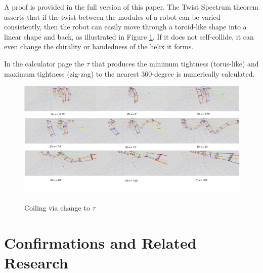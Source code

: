 \documentclass{svproc}
\begin{document}
A proof is provided in the full version of this paper\cite{readfullsegmentedhelix}.
The Twist Spectrum theorem asserts that if the twist between the modules of a robot
can be varied consistently, then the robot can easily move through a toroid-like shape
into a linear shape and back, as illustrated in Figure \ref{fig:coiling}. If it does not self-collide, it can even change the chirality
or handedness of the helix it forms.

In the calculator page
the $\tau$ that produces the minimum tightness (torus-like) and maximum tightness (zig-zag) to the
nearest 360-degree is numerically calculated.

\begin{figure}
  \centering


{\includegraphics[width=1.0\textwidth]{figures/CoilingFigure.png}}
\caption{Coiling via change to $\tau$}\label{fig:coiling}
\end{figure}

\section{Confirmations and Related Research}
\end{document}

